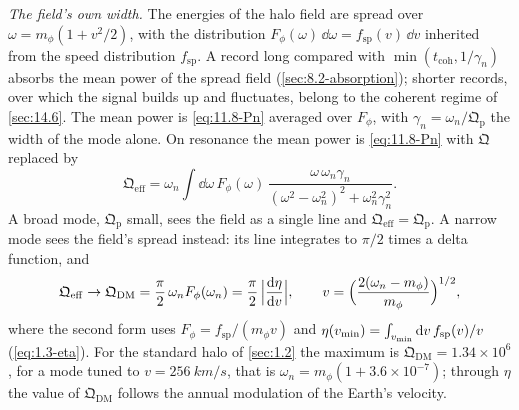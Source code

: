 \emph{The field's own width.} The energies of the halo field are spread over $\omega = m_\phi(1 + v^2/2)$, with the distribution $F_\phi(\omega)\,\dd\omega = f_{\mathrm{sp}}(v)\,\dd v$ inherited from the speed distribution $f_{\mathrm{sp}}$. A record long compared with $\min(t_{\mathrm{coh}}, 1/\gamma_n)$ absorbs the mean power of the spread field (\cref{sec:8.2-absorption}); shorter records, over which the signal builds up and fluctuates, belong to the coherent regime of \cref{sec:14.6}. The mean power is \cref{eq:11.8-Pn} averaged over $F_\phi$, with $\gamma_n = \omega_n/\mathfrak{Q}_{\mathrm{p}}$ the width of the mode alone. On resonance the mean power is \cref{eq:11.8-Pn} with $\mathfrak{Q}$ replaced by
\begin{equation}
  \mathfrak{Q}_{\mathrm{eff}} = \omega_n\int\dd\omega\,F_\phi(\omega)\,\frac{\omega\,\omega_n\gamma_n}{(\omega^2 - \omega_n^2)^2 + \omega_n^2\gamma_n^2} .
  \label{eq:11.8-Qeff}
\end{equation}
A broad mode, $\mathfrak{Q}_{\mathrm{p}}$ small, sees the field as a single line and $\mathfrak{Q}_{\mathrm{eff}} = \mathfrak{Q}_{\mathrm{p}}$. A narrow mode sees the field's spread instead: its line integrates to $\pi/2$ times a delta function, and
\begin{equation}
  \mathfrak{Q}_{\mathrm{eff}} \to \mathfrak{Q}_{\mathrm{DM}} = \frac{\pi}{2}\,\omega_nF_\phi(\omega_n) = \frac{\pi}{2}\,\Bigl|\frac{\mathrm{d}\eta}{\mathrm{d} v}\Bigr| ,
  \qquad v = \Bigl(\frac{2(\omega_n - m_\phi)}{m_\phi}\Bigr)^{1/2} ,
  \label{eq:11.8-QDM}
\end{equation}
where the second form uses $F_\phi = f_{\mathrm{sp}}/(m_\phi v)$ and $\eta(v_{\mathrm{min}}) = \int_{v_{\mathrm{min}}}\mathrm{d} v\,f_{\mathrm{sp}}(v)/v$ (\cref{eq:1.3-eta}). For the standard halo of \cref{sec:1.2} the maximum is $\mathfrak{Q}_{\mathrm{DM}} = 1.34\times10^6$, for a mode tuned to $v = \SI{256}{km/s}$, that is $\omega_n = m_\phi(1 + 3.6\times10^{-7})$; through $\eta$ the value of $\mathfrak{Q}_{\mathrm{DM}}$ follows the annual modulation of the Earth's velocity.

